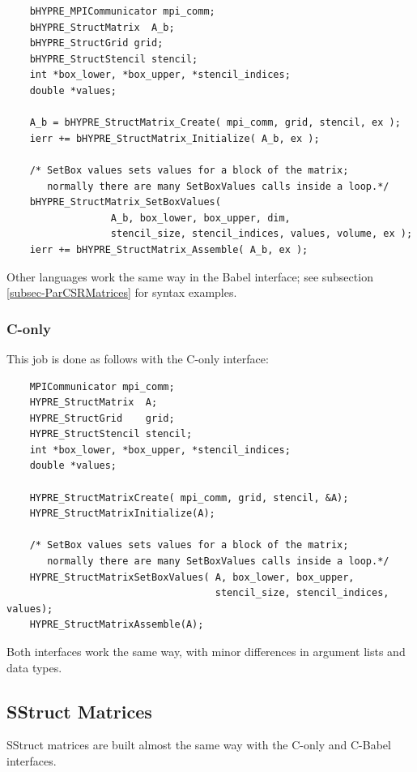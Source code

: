 \begin{verbatim}
    bHYPRE_MPICommunicator mpi_comm;
    bHYPRE_StructMatrix  A_b;
    bHYPRE_StructGrid grid;
    bHYPRE_StructStencil stencil;
    int *box_lower, *box_upper, *stencil_indices;
    double *values;

    A_b = bHYPRE_StructMatrix_Create( mpi_comm, grid, stencil, ex );
    ierr += bHYPRE_StructMatrix_Initialize( A_b, ex );

    /* SetBox values sets values for a block of the matrix;
       normally there are many SetBoxValues calls inside a loop.*/
    bHYPRE_StructMatrix_SetBoxValues(
                  A_b, box_lower, box_upper, dim,
                  stencil_size, stencil_indices, values, volume, ex );
    ierr += bHYPRE_StructMatrix_Assemble( A_b, ex );
\end{verbatim}


Other languages work the same way in the Babel interface; see
subsection \ref{subsec-ParCSRMatrices} for syntax examples.

\subsubsection{C-only}

This job is done as follows with the C-only interface:

\begin{verbatim}
    MPICommunicator mpi_comm;
    HYPRE_StructMatrix  A;
    HYPRE_StructGrid    grid;
    HYPRE_StructStencil stencil;
    int *box_lower, *box_upper, *stencil_indices;
    double *values;

    HYPRE_StructMatrixCreate( mpi_comm, grid, stencil, &A);
    HYPRE_StructMatrixInitialize(A);

    /* SetBox values sets values for a block of the matrix;
       normally there are many SetBoxValues calls inside a loop.*/
    HYPRE_StructMatrixSetBoxValues( A, box_lower, box_upper,
                                    stencil_size, stencil_indices, values);
    HYPRE_StructMatrixAssemble(A);
\end{verbatim}


Both interfaces work the same way, with minor differences in argument
lists and data types.

\subsection{SStruct Matrices}

SStruct matrices are built almost the same way with
the C-only and C-Babel interfaces.

